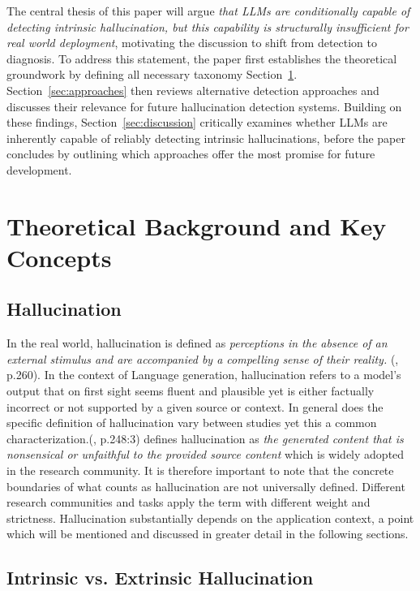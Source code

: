 \documentclass[
  seminar,   	 
  english,   	 
  titlepage=on,
  captions=tableheadings
]{ttlab-qualify}
\begin{document}
The central thesis of this paper will argue \textit{that LLMs are conditionally capable of detecting intrinsic hallucination, but this capability is structurally insufficient for real world deployment}, motivating the discussion to shift from detection to diagnosis. To address this statement, the paper first establishes the theoretical groundwork by defining all necessary taxonomy Section~\ref{sec:Definitions and theoretical basis}. Section~\ref{sec:approaches} then reviews alternative detection approaches and discusses their relevance for future hallucination detection systems. Building on these findings, Section~\ref{sec:discussion} critically examines whether LLMs are inherently capable of reliably detecting intrinsic hallucinations, before the paper concludes by outlining which approaches offer the most promise for future development.

\section{Theoretical Background and Key Concepts} \label{sec:Definitions and theoretical basis}

\subsection{Hallucination}

In the real world, hallucination is defined as \textit{perceptions in the absence of an external stimulus and are accompanied by a compelling sense of their reality.} (\cite{boksa2009hallucinations}, p.260). In the context of Language generation, hallucination refers to a model's output that on first sight seems fluent and plausible yet is either factually incorrect or not supported by a given source or context. In general does the specific definition of hallucination vary between studies yet this a common characterization.(\cite{Ji2023HallucinationSurvey}, p.248:3) defines hallucination as \textit{the generated content that is nonsensical or unfaithful to the provided source content} which is widely adopted in the research community. It is therefore important to note that the concrete boundaries of what counts as hallucination are not universally defined. Different research communities and tasks apply the term with different weight and strictness. Hallucination substantially depends on the application context, a point which will be mentioned and discussed in greater detail in the following sections.

\subsection{Intrinsic vs. Extrinsic Hallucination}
\end{document}
